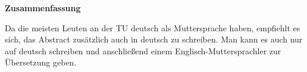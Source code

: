 \thispagestyle{empty}
\vspace*{0.2cm}

\begin{center}
    \textbf{Zusammenfassung}
\end{center}

\vspace*{0.2cm}

\noindent
Da die meisten Leuten an der TU deutsch als Muttersprache haben, empfiehlt es sich, das Abstract zusätzlich auch in deutsch zu schreiben. Man kann es auch nur auf deutsch schreiben und anschließend einem Englisch-Muttersprachler zur Übersetzung geben.
